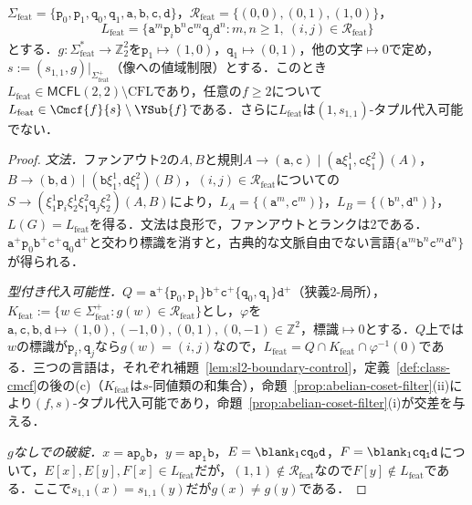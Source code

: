 \begin{proposition}[有限素性の認可を伴う交差依存]
\label{prop:feature-cross-typed}
$\Sigma_{\mathrm{feat}}=\{\mathtt p_0,\mathtt p_1,\mathtt q_0,\mathtt q_1,\mathtt a,\mathtt b,\mathtt c,\mathtt d\}$，$\mathcal R_{\mathrm{feat}}=\{(0,0),(0,1),(1,0)\}$，
\[
 L_{\mathrm{feat}}=\{\mathtt a^m\mathtt p_i\mathtt b^n\mathtt c^m\mathtt q_j\mathtt d^n:
 m,n\ge1,\ (i,j)\in\mathcal R_{\mathrm{feat}}\}
\]
とする．$g:\Sigma_{\mathrm{feat}}^*\to\mathbb Z_2^2$を$\mathtt p_1\mapsto(1,0)$，$\mathtt q_1\mapsto(0,1)$，他の文字$\mapsto0$で定め，$s:=(s_{1,1},g)|_{\Sigma_{\mathrm{feat}}^+}$（像への値域制限）とする．このとき$L_{\mathrm{feat}}\in\mathsf{MCFL}(2,2)\setminus\mathrm{CFL}$であり，任意の$f\ge2$について$L_{\mathrm{feat}}\in\Cmcf{f}{s}\setminus\YSub{f}$である．さらに$L_{\mathrm{feat}}$は$(1,s_{1,1})$-タプル代入可能でない．
\end{proposition}

\begin{proof}
\emph{文法．}ファンアウト2の$A,B$と規則$A\to(\mathtt a,\mathtt c)\mid(\mathtt a\xi_1^1,\mathtt c\xi_1^2)(A)$，$B\to(\mathtt b,\mathtt d)\mid(\mathtt b\xi_1^1,\mathtt d\xi_1^2)(B)$，$(i,j)\in\mathcal R_{\mathrm{feat}}$についての$S\to(\xi_1^1\mathtt p_i\xi_2^1\xi_1^2\mathtt q_j\xi_2^2)(A,B)$により，$L_A=\{(\mathtt a^m,\mathtt c^m)\}$，$L_B=\{(\mathtt b^n,\mathtt d^n)\}$，$L(G)=L_{\mathrm{feat}}$を得る．文法は良形で，ファンアウトとランクは2である．$\mathtt a^+\mathtt p_0\mathtt b^+\mathtt c^+\mathtt q_0\mathtt d^+$と交わり標識を消すと，古典的な文脈自由でない言語$\{\mathtt a^m\mathtt b^n\mathtt c^m\mathtt d^n\}$が得られる．

\emph{型付き代入可能性．}$Q=\mathtt a^+\{\mathtt p_0,\mathtt p_1\}\mathtt b^+\mathtt c^+\{\mathtt q_0,\mathtt q_1\}\mathtt d^+$（狭義2-局所），$K_{\mathrm{feat}}:=\{w\in\Sigma_{\mathrm{feat}}^+:g(w)\in\mathcal R_{\mathrm{feat}}\}$とし，$\varphi$を$\mathtt a,\mathtt c,\mathtt b,\mathtt d\mapsto(1,0),(-1,0),(0,1),(0,-1)\in\mathbb Z^2$，標識$\mapsto0$とする．$Q$上では$w$の標識が$\mathtt p_i,\mathtt q_j$なら$g(w)=(i,j)$なので，$L_{\mathrm{feat}}=Q\cap K_{\mathrm{feat}}\cap\varphi^{-1}(0)$である．三つの言語は，それぞれ補題~\ref{lem:sl2-boundary-control}，定義~\ref{def:class-cmcf}の後の(c)（$K_{\mathrm{feat}}$は$s$-同値類の和集合），命題~\ref{prop:abelian-coset-filter}(ii)により$(f,s)$-タプル代入可能であり，命題~\ref{prop:abelian-coset-filter}(i)が交差を与える．

\emph{$g$なしでの破綻．}$x=\mathtt{ap_0b}$，$y=\mathtt{ap_1b}$，$E=\blank_1\mathtt{cq_0d}$，$F=\blank_1\mathtt{cq_1d}$について，$E[x],E[y],F[x]\in L_{\mathrm{feat}}$だが，$(1,1)\notin\mathcal R_{\mathrm{feat}}$なので$F[y]\notin L_{\mathrm{feat}}$である．ここで$s_{1,1}(x)=s_{1,1}(y)$だが$g(x)\ne g(y)$である．
\end{proof}

